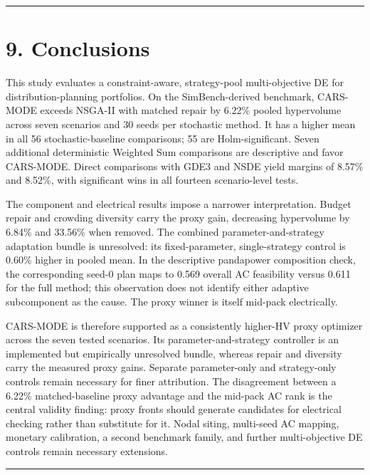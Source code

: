 \documentclass[
  10pt,
  a4paper,
]{article}
\begin{document}
\begin{center}\rule{0.5\linewidth}{0.5pt}\end{center}

\section{9. Conclusions}\label{conclusions}

This study evaluates a constraint-aware, strategy-pool multi-objective
DE for distribution-planning portfolios. On the SimBench-derived
benchmark, CARS-MODE exceeds NSGA-II with matched repair by 6.22\%
pooled hypervolume across seven scenarios and 30 seeds per stochastic
method. It has a higher mean in all 56 stochastic-baseline comparisons;
55 are Holm-significant. Seven additional deterministic Weighted Sum
comparisons are descriptive and favor CARS-MODE. Direct comparisons with
GDE3 and NSDE yield margins of 8.57\% and 8.52\%, with significant wins
in all fourteen scenario-level tests.

The component and electrical results impose a narrower interpretation.
Budget repair and crowding diversity carry the proxy gain, decreasing
hypervolume by 6.84\% and 33.56\% when removed. The combined
parameter-and-strategy adaptation bundle is unresolved: its
fixed-parameter, single-strategy control is 0.60\% higher in pooled
mean. In the descriptive pandapower composition check, the corresponding
seed-0 plan maps to 0.569 overall AC feasibility versus 0.611 for the
full method; this observation does not identify either adaptive
subcomponent as the cause. The proxy winner is itself mid-pack
electrically.

CARS-MODE is therefore supported as a consistently higher-HV proxy
optimizer across the seven tested scenarios. Its parameter-and-strategy
controller is an implemented but empirically unresolved bundle, whereas
repair and diversity carry the measured proxy gains. Separate
parameter-only and strategy-only controls remain necessary for finer
attribution. The disagreement between a 6.22\% matched-baseline proxy
advantage and the mid-pack AC rank is the central validity finding:
proxy fronts should generate candidates for electrical checking rather
than substitute for it. Nodal siting, multi-seed AC mapping, monetary
calibration, a second benchmark family, and further multi-objective DE
controls remain necessary extensions.

\begin{center}\rule{0.5\linewidth}{0.5pt}\end{center}
\end{document}
